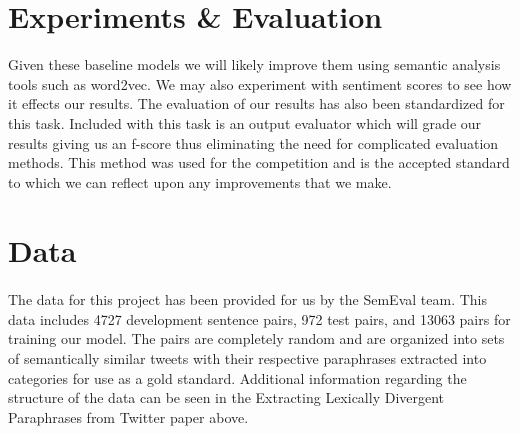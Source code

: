 \documentclass[dvips,12pt]{article}
\begin{document}
\section{Experiments \& Evaluation}
Given these baseline models we will likely improve them using semantic analysis tools such as word2vec. We may also experiment with sentiment scores to see how it effects our results. The evaluation of our results has also been standardized for this task. Included with this task is an output evaluator which will grade our results giving us an f-score thus eliminating the need for complicated evaluation methods. This method was used for the competition and is the accepted standard to which we can reflect upon any improvements that we make.

\section{Data}
\paragraph{}
The data for this project has been provided for us by the SemEval team. This data includes 4727 development sentence pairs, 972 test pairs, and 13063 pairs for training our model. The pairs are completely random and are organized into sets of semantically similar tweets with their respective paraphrases extracted into categories for use as a gold standard. Additional information regarding the structure of the data can be seen in the Extracting Lexically Divergent Paraphrases from Twitter paper above.




\end{document}
